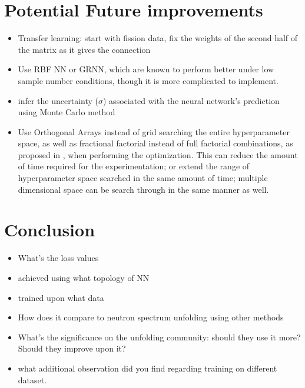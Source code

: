 \documentclass[a4paper, 12pt]{article}
\begin{document}
\section{Potential Future improvements}
\begin{itemize}
    \item Transfer learning: start with fission data, fix the weights of the second half of the matrix as it gives the connection
    \item Use RBF NN or GRNN, which are known to perform better under low sample number conditions, though it is more complicated to implement.
    \item infer the uncertainty ($\sigma$) associated with the neural network's prediction using Monte Carlo method
    \item Use Orthogonal Arrays instead of grid searching the entire hyperparameter space, as well as fractional factorial instead of full factorial combinations, as proposed in \cite{RDANNM}, when performing the optimization. This can reduce the amount of time required for the experimentation; or extend the range of hyperparameter space searched in the same amount of time; multiple dimensional space can be search through in the same manner as well.
\end{itemize}

\section{Conclusion}
\begin{itemize}
    \item What's the loss values
    \item achieved using what topology of NN
    \item trained upon what data
    \item How does it compare to neutron spectrum unfolding using other methods
    \item What's the significance on the unfolding community: should they use it more? Should they improve upon it?
    \item what additional observation did you find regarding training on different dataset.
\end{itemize}



\end{document}
